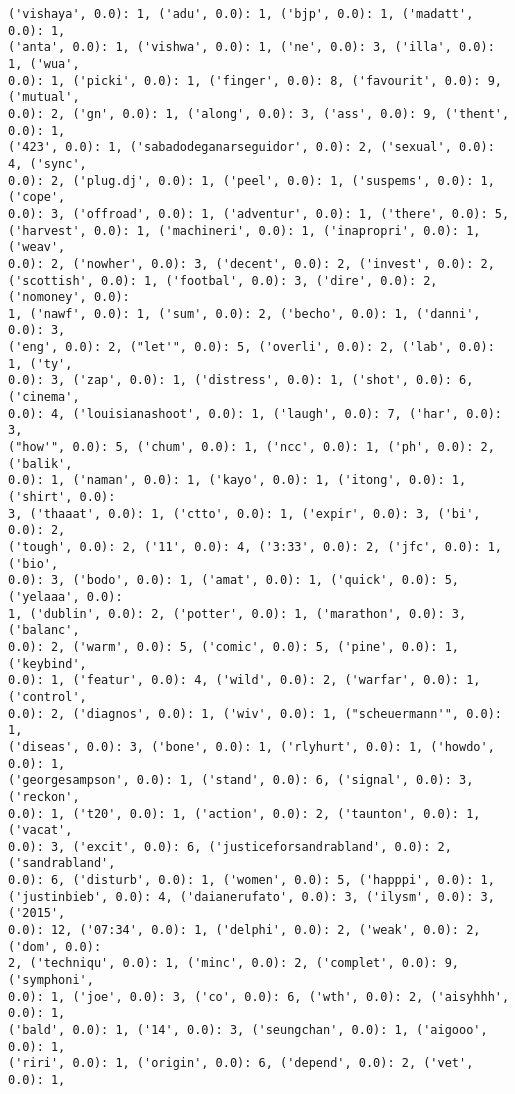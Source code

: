 \documentclass[11pt]{article}
\begin{document}
\begin{Verbatim}[commandchars=\\\{\}]
('vishaya', 0.0): 1, ('adu', 0.0): 1, ('bjp', 0.0): 1, ('madatt', 0.0): 1,
('anta', 0.0): 1, ('vishwa', 0.0): 1, ('ne', 0.0): 3, ('illa', 0.0): 1, ('wua',
0.0): 1, ('picki', 0.0): 1, ('finger', 0.0): 8, ('favourit', 0.0): 9, ('mutual',
0.0): 2, ('gn', 0.0): 1, ('along', 0.0): 3, ('ass', 0.0): 9, ('thent', 0.0): 1,
('423', 0.0): 1, ('sabadodeganarseguidor', 0.0): 2, ('sexual', 0.0): 4, ('sync',
0.0): 2, ('plug.dj', 0.0): 1, ('peel', 0.0): 1, ('suspems', 0.0): 1, ('cope',
0.0): 3, ('offroad', 0.0): 1, ('adventur', 0.0): 1, ('there', 0.0): 5,
('harvest', 0.0): 1, ('machineri', 0.0): 1, ('inapropri', 0.0): 1, ('weav',
0.0): 2, ('nowher', 0.0): 3, ('decent', 0.0): 2, ('invest', 0.0): 2,
('scottish', 0.0): 1, ('footbal', 0.0): 3, ('dire', 0.0): 2, ('nomoney', 0.0):
1, ('nawf', 0.0): 1, ('sum', 0.0): 2, ('becho', 0.0): 1, ('danni', 0.0): 3,
('eng', 0.0): 2, ("let'", 0.0): 5, ('overli', 0.0): 2, ('lab', 0.0): 1, ('ty',
0.0): 3, ('zap', 0.0): 1, ('distress', 0.0): 1, ('shot', 0.0): 6, ('cinema',
0.0): 4, ('louisianashoot', 0.0): 1, ('laugh', 0.0): 7, ('har', 0.0): 3,
("how'", 0.0): 5, ('chum', 0.0): 1, ('ncc', 0.0): 1, ('ph', 0.0): 2, ('balik',
0.0): 1, ('naman', 0.0): 1, ('kayo', 0.0): 1, ('itong', 0.0): 1, ('shirt', 0.0):
3, ('thaaat', 0.0): 1, ('ctto', 0.0): 1, ('expir', 0.0): 3, ('bi', 0.0): 2,
('tough', 0.0): 2, ('11', 0.0): 4, ('3:33', 0.0): 2, ('jfc', 0.0): 1, ('bio',
0.0): 3, ('bodo', 0.0): 1, ('amat', 0.0): 1, ('quick', 0.0): 5, ('yelaaa', 0.0):
1, ('dublin', 0.0): 2, ('potter', 0.0): 1, ('marathon', 0.0): 3, ('balanc',
0.0): 2, ('warm', 0.0): 5, ('comic', 0.0): 5, ('pine', 0.0): 1, ('keybind',
0.0): 1, ('featur', 0.0): 4, ('wild', 0.0): 2, ('warfar', 0.0): 1, ('control',
0.0): 2, ('diagnos', 0.0): 1, ('wiv', 0.0): 1, ("scheuermann'", 0.0): 1,
('diseas', 0.0): 3, ('bone', 0.0): 1, ('rlyhurt', 0.0): 1, ('howdo', 0.0): 1,
('georgesampson', 0.0): 1, ('stand', 0.0): 6, ('signal', 0.0): 3, ('reckon',
0.0): 1, ('t20', 0.0): 1, ('action', 0.0): 2, ('taunton', 0.0): 1, ('vacat',
0.0): 3, ('excit', 0.0): 6, ('justiceforsandrabland', 0.0): 2, ('sandrabland',
0.0): 6, ('disturb', 0.0): 1, ('women', 0.0): 5, ('happpi', 0.0): 1,
('justinbieb', 0.0): 4, ('daianerufato', 0.0): 3, ('ilysm', 0.0): 3, ('2015',
0.0): 12, ('07:34', 0.0): 1, ('delphi', 0.0): 2, ('weak', 0.0): 2, ('dom', 0.0):
2, ('techniqu', 0.0): 1, ('minc', 0.0): 2, ('complet', 0.0): 9, ('symphoni',
0.0): 1, ('joe', 0.0): 3, ('co', 0.0): 6, ('wth', 0.0): 2, ('aisyhhh', 0.0): 1,
('bald', 0.0): 1, ('14', 0.0): 3, ('seungchan', 0.0): 1, ('aigooo', 0.0): 1,
('riri', 0.0): 1, ('origin', 0.0): 6, ('depend', 0.0): 2, ('vet', 0.0): 1,

\end{Verbatim}
\end{document}
